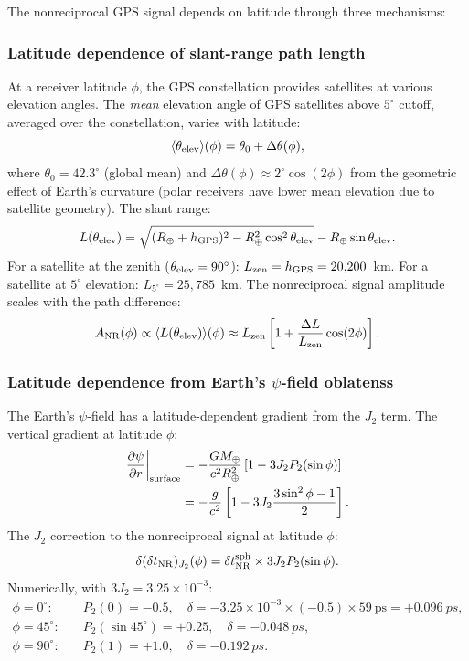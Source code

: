 \documentclass[aps,prd,twocolumn,superscriptaddress,nofootinbib,longbibliography]{revtex4-2}
\begin{document}
The nonreciprocal GPS signal depends on latitude through three mechanisms:

\subsubsection{Latitude dependence of slant-range path length}

At a receiver latitude $\phi$, the GPS constellation provides satellites at
various elevation angles.  The \emph{mean} elevation angle of GPS satellites
above $5^\circ$ cutoff, averaged over the constellation, varies with latitude:
\begin{equation}
\langle\theta_{\rm elev}\rangle(\phi) = \theta_0 + \Delta\theta(\phi),
\end{equation}
where $\theta_0 = 42.3^\circ$ (global mean) and
$\Delta\theta(\phi) \approx 2^\circ\cos(2\phi)$ from the geometric effect of
Earth's curvature (polar receivers have lower mean elevation due to satellite
geometry).  The slant range:
\begin{equation}
L(\theta_{\rm elev}) = \sqrt{(R_\oplus + h_{\rm GPS})^2 - R_\oplus^2\cos^2\theta_{\rm elev}}
- R_\oplus\sin\theta_{\rm elev}.
\end{equation}
For a satellite at the zenith ($\theta_{\rm elev} = 90^\circ$):
$L_{\rm zen} = h_{\rm GPS} = 20{,}200$~km.  For a satellite at $5^\circ$
elevation: $L_{5^\circ} = 25{,}785$~km.  The nonreciprocal signal
amplitude scales with the path difference:
\begin{equation}
A_{\rm NR}(\phi) \propto \langle L(\theta_{\rm elev})\rangle(\phi)
\approx L_{\rm zen}\left[1 + \frac{\Delta L}{L_{\rm zen}}\cos(2\phi)\right].
\end{equation}

\subsubsection{Latitude dependence from Earth's $\psi$-field oblatenss}

The Earth's $\psi$-field has a latitude-dependent gradient from the $J_2$
term.  The vertical gradient at latitude $\phi$:
\begin{align}
\frac{\partial\psi}{\partial r}\bigg|_{\rm surface}
&= -\frac{GM_\oplus}{c^2 R_\oplus^2}\left[1 - 3J_2 P_2(\sin\phi)\right]
\nonumber\\
&= -\frac{g}{c^2}\left[1 - 3J_2\frac{3\sin^2\phi - 1}{2}\right].
\end{align}
The $J_2$ correction to the nonreciprocal signal at latitude $\phi$:
\begin{equation}
\delta(\delta t_{\rm NR})_{J_2}(\phi)
= \delta t_{\rm NR}^{\rm sph}\times 3J_2 P_2(\sin\phi).
\end{equation}
Numerically, with $3J_2 = 3.25\times10^{-3}$:
\begin{align}
\phi = 0^\circ:&\quad P_2(0) = -0.5,\quad
\delta = -3.25\times10^{-3}\times(-0.5)\times59\ \text{ps} = +0.096\ \si{ps},\nonumber\\
\phi = 45^\circ:&\quad P_2(\sin45^\circ) = +0.25,\quad
\delta = -0.048\ \si{ps},\nonumber\\
\phi = 90^\circ:&\quad P_2(1) = +1.0,\quad
\delta = -0.192\ \si{ps}.
\end{align}
\end{document}
